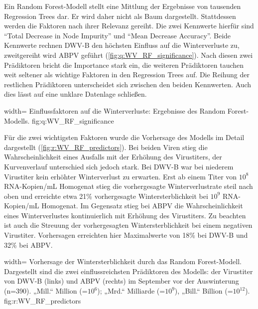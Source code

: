  Ein Random Forest-Modell stellt eine Mittlung der Ergebnisse von tausenden Regression Trees dar. Er wird daher nicht als Baum dargestellt. Stattdessen werden die Faktoren nach ihrer Relevanz gereiht. Die zwei Kennwerte hierfür sind \enquote{Total Decrease in Node Impurity} und \enquote{Mean Decrease Accuracy}. Beide Kennwerte rechnen DWV-B den höchsten Einfluss auf die Winterverluste zu, zweitgereiht wird ABPV geführt (\cref{fig:q:WV_RF_significance}). Nach diesen zwei Prädiktoren bricht die Importance stark ein, die weiteren Prädiktoren tauchen weit seltener als wichtige Faktoren in den Regression Trees auf. Die Reihung der restlichen Prädiktoren unterscheidet sich zwischen den beiden Kennwerten. Auch dies lässt auf eine unklare Datenlage schließen.

 
  {width=\textwidth} %
  {Einflussfaktoren auf die Winterverluste: Ergebnisse des Random Forest-Modells.} %
  {} %
  {fig:q:WV_RF_significance} %
  
  Für die zwei wichtigsten Faktoren wurde die Vorhersage des Modells im Detail dargestellt (\cref{fig:r:WV_RF_predictors}). Bei beiden Viren stieg die Wahrscheinlichkeit eines Ausfalls mit der Erhöhung des Virustiters, der Kurvenverlauf unterschied sich jedoch stark. Bei DWV-B war bei niederem Virustiter kein erhöhter Winterverlust zu erwarten. Erst ab einem Titer von $10^8$ RNA-Kopien/\si{\milli\liter} Homogenat stieg die vorhergesagte Winterverlustrate steil nach oben und erreichte etwa 21\% vorhergesagte Wintersterblichkeit bei $10^9$ RNA-Kopien/\si{\milli\liter} Homogenat. Im Gegensatz stieg bei ABPV die Wahrscheinlichkeit eines Winterverlustes kontinuierlich mit Erhöhung des Virustiters. Zu beachten ist auch die Streuung der vorhergesagten Wintersterblichkeit bei einem negativen Virustiter. Vorhersagen erreichten hier Maximalwerte von 18\% bei DWV-B und 32\% bei ABPV.
  
  
  {width=\textwidth} %
  {Vorhersage der Wintersterblichkeit durch das Random Forest-Modell. Dargestellt sind die zwei einflussreichsten Prädiktoren des Modells: der Virustiter von DWV-B (links) und ABPV (rechts) im September vor der Auswinterung (n=390). „Mill.“ Million (=$10^6$); „Mrd.“ Milliarde (=$10^9$), „Bill.“ Billion (=$10^{12}$).} %
  {} %
  {fig:r:WV_RF_predictors} %
  
